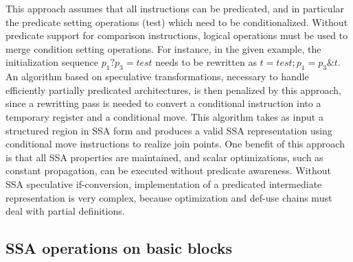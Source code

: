 This approach assumes that all instructions can be predicated, and in particular the predicate setting operations (test) which need to be conditionalized. Without predicate support for comparison instructions, logical operations must be used to merge condition setting operations. For instance, in the given example, the initialization sequence $p_1 ? p_3=test$ needs to be rewritten as $t=test; p_1=p_3 \& t$. An algorithm based on speculative transformations, necessary to handle efficiently partially predicated architectures, is then penalized by this approach, since a rewritting pass is needed to convert a conditional instruction into a temporary register and a conditional move.
This algorithm takes as input a structured region in SSA form and produces a valid SSA representation using conditional move instructions to realize join points. One benefit of this approach is that all SSA properties are maintained, and scalar optimizations, such as constant propagation, can be executed without predicate awareness. Without SSA speculative if-conversion, implementation of a predicated intermediate representation is very complex, because optimization and def-use chains must deal with partial definitions.

\subsection{SSA operations on basic blocks}

